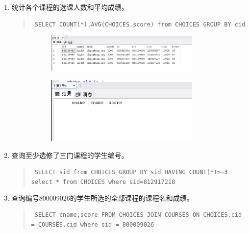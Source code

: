 \documentclass[a4paper,twoside]{article}
\begin{document}
\begin{spacing}{1.2}
\begin{enumerate}
\item 统计各个课程的选课人数和平均成绩。
\begin{quote}
\texttt{
SELECT COUNT(*),AVG(CHOICES.score) from CHOICES
GROUP BY cid
}
\end{quote}


\begin{figure}[h]
\centering
\caption{运行结果}
\begin{subfigure}{0.3\textwidth}
  \includegraphics[width=0.9\textwidth]{fig15.png}
\end{subfigure}
\begin{subfigure}{0.3\textwidth}
  \includegraphics[width=0.9\textwidth]{fig16.png}
\end{subfigure}
\end{figure}


\item 查询至少选修了三门课程的学生编号。
\begin{quote}
\texttt{
SELECT sid from CHOICES
GROUP BY sid
HAVING COUNT(*)>=3
select * from CHOICES where sid=812917218 
}
\end{quote}


\item 查询编号800009026的学生所选的全部课程的课程名和成绩。
\begin{quote}
\texttt{
SELECT cname,score FROM CHOICES JOIN COURSES ON CHOICES.cid = COURSES.cid
where sid = 800009026
}
\end{quote}


\end{enumerate}
\end{spacing}
\end{document}
